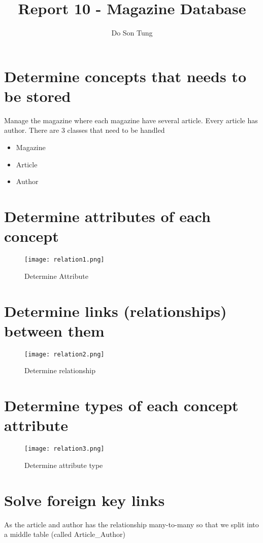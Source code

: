 \documentclass[12pt]{article}
\title{Report 10 - Magazine Database}
\author{Do Son Tung}
\date{} %
\begin{document}
\maketitle

\section{Determine concepts that needs to be stored}
Manage the magazine where each magazine have several article. Every article has author.
There are 3 classes that need to be handled
\begin{itemize}
\item {Magazine}
\item {Article}
\item {Author}
\end{itemize}
\section{Determine attributes of each concept}
\begin{figure}[H]
  \texttt{[image: relation1.png]}
  \caption{Determine Attribute}
  \label{fig:relation1}
\end{figure}

\section{Determine links (relationships) between them}
\begin{figure}[H]
  \texttt{[image: relation2.png]}
  \caption{Determine relationship}
  \label{fig:relation2}
\end{figure}

\section{Determine types of each concept attribute}
\begin{figure}[H]
  \texttt{[image: relation3.png]}
  \caption{Determine attribute type}
  \label{fig:relation3}
\end{figure}

\pagebreak

\section{Solve foreign key links}

As the article and author has the relationship many-to-many
so that we split into a middle table (called Article\_Author)
\end{document}
